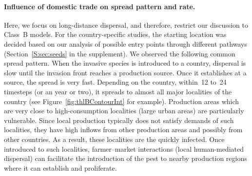 \documentclass[11pt]{article}
\theoremstyle{definition}
\begin{document}


\paragraph{Influence of domestic trade on spread pattern and rate.}
Here, we focus on long-distance dispersal, and therefore, restrict our
discussion to Class~B models. For the country-specific studies, the starting location was decided based
on our analysis of possible entry points through different pathways
(Section~\ref{S:sec:seeds} in the supplement).  We observed the following
common spread pattern.  When the invasive species is introduced to a
country, dispersal is slow until the invasion front reaches a {production
source}. Once it establishes at a source, the spread is very fast.
Depending on the country, within~12 to~24 timesteps (or an year or two), it spreads to almost all major localities of the country
(see Figure~\ref{fig:thlBContourInt} for example). Production areas which
are very close to high-consumption localities (large urban areas) are
particularly vulnerable. Since local production typically does not satisfy
demands of such localities, they have high inflows from other production
areas and possibly from other countries. As a result, these localities are
the quickly infected. Once introduced to such localities, farmer--market
interactions (local human-mediated dispersal) can facilitate the
introduction of the pest to nearby production regions where it can
establish and proliferate.
\end{document}

